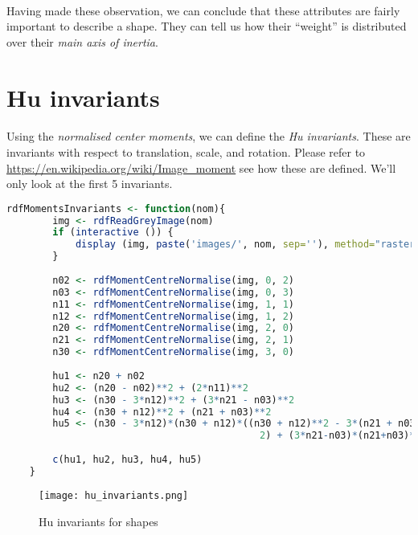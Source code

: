 \paragraph{}
Having made these observation, we can conclude that these attributes are fairly important to describe a shape. They can tell us how their ``weight'' is distributed over their \emph{main axis of inertia}.

\clearpage

\section{Hu invariants}
\paragraph{}
Using the \emph{normalised center moments}, we can define the \emph{Hu invariants}. These are invariants with respect to translation, scale, and rotation.
Please refer to \url{https://en.wikipedia.org/wiki/Image_moment} see how these are defined. We'll only look at the first 5 invariants.

\begin{lstlisting}[language=R, caption=Calculating Hu invariants]
    rdfMomentsInvariants <- function(nom){
        img <- rdfReadGreyImage(nom)
        if (interactive ()) {
            display (img, paste('images/', nom, sep=''), method="raster", all=TRUE)
        }
        
        n02 <- rdfMomentCentreNormalise(img, 0, 2)
        n03 <- rdfMomentCentreNormalise(img, 0, 3)
        n11 <- rdfMomentCentreNormalise(img, 1, 1)
        n12 <- rdfMomentCentreNormalise(img, 1, 2)
        n20 <- rdfMomentCentreNormalise(img, 2, 0)
        n21 <- rdfMomentCentreNormalise(img, 2, 1)
        n30 <- rdfMomentCentreNormalise(img, 3, 0)
        
        hu1 <- n20 + n02
        hu2 <- (n20 - n02)**2 + (2*n11)**2
        hu3 <- (n30 - 3*n12)**2 + (3*n21 - n03)**2
        hu4 <- (n30 + n12)**2 + (n21 + n03)**2
        hu5 <- (n30 - 3*n12)*(n30 + n12)*((n30 + n12)**2 - 3*(n21 + n03) **
                                            2) + (3*n21-n03)*(n21+n03)*(3*(n30 + n12)**2 - (n21 + n03)**2)
        
        c(hu1, hu2, hu3, hu4, hu5)
    }
\end{lstlisting}

\begin{figure}[h]
    \centering
    \texttt{[image: hu\_invariants.png]}
    \caption{Hu invariants for shapes}
\end{figure}

